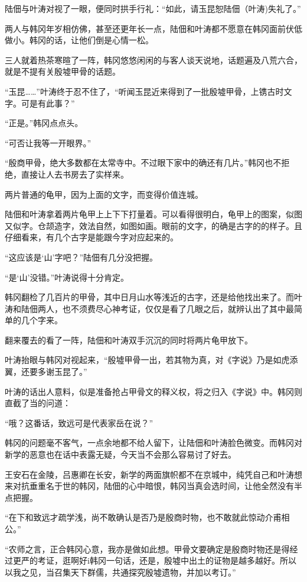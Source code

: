 陆佃与叶涛对视了一眼，便同时拱手行礼：“如此，请玉昆恕陆佃（叶涛)失礼了。”

两人与韩冈年岁相仿佛，甚至还更年长一点，陆佃和叶涛都不愿意在韩冈面前伏低做小。韩冈的话，让他们倒是心情一松。

三人就着热茶寒暄了一阵，韩冈悠悠闲闲的与客人谈天说地，话题遍及八荒六合，就是不提有关殷墟甲骨的话题。

“玉昆……”叶涛终于忍不住了，“听闻玉昆近来得到了一批殷墟甲骨，上镌古时文字。可是有此事？”

“正是。”韩冈点点头。

“可否让我等一开眼界。”

“殷商甲骨，绝大多数都在太常寺中。不过眼下家中的确还有几片。”韩冈也不拒绝，直接让人去书房去了实样来。

两片普通的龟甲，因为上面的文字，而变得价值连城。

陆佃和叶涛拿着两片龟甲上上下下打量着。可以看得很明白，龟甲上的图案，似图又似字。仓颉造字，效法自然，如图如画。眼前的文字，的确是古字的的样子。且仔细看来，有几个古字是能跟今字对应起来的。

“这应该是‘山’字吧？”陆佃有几分没把握。

“是‘山’没错。”叶涛说得十分肯定。

韩冈翻检了几百片的甲骨，其中日月山水等浅近的古字，还是给他找出来了。而叶涛和陆佃两人，也不须费尽心神考证，仅仅是看了几眼之后，就辨认出了其中最简单的几个字来。

翻来覆去的看了一阵，陆佃和叶涛双手沉沉的同时将两片龟甲放下。

叶涛抬眼与韩冈对视起来，“殷墟甲骨一出，若其物为真，对《字说》乃是如虎添翼，还要多谢玉昆了。”

叶涛的话出人意料，似是准备抢占甲骨文的释义权，将之归入《字说》中。韩冈则直截了当的问道：

“哦？这番话，致远可是代表家岳在说？”

韩冈的问题毫不客气，一点余地都不给人留下，让陆佃和叶涛脸色微变。而韩冈对新学的恶意也在话中表露无疑，今天当不会那么容易讨了好去。

王安石在金陵，吕惠卿在长安，新学的两面旗帜都不在京城中，纯凭自己和叶涛想来对抗垂重名于世的韩冈，陆佃的心中暗恨，韩冈当真会选时间，让他全然没有半点把握。

“在下和致远才疏学浅，尚不敢确认是否乃是殷商时物，也不敢就此惊动介甫相公。”

“农师之言，正合韩冈心意，我亦是做如此想。甲骨文要确定是殷商时物还是得经过更严的考证，逛啊好i韩冈一句话，还是，殷墟中出土的证物是越多越好。所以以我之见，当召集天下群儒，共通探究殷墟遗物，并加以考订。”

